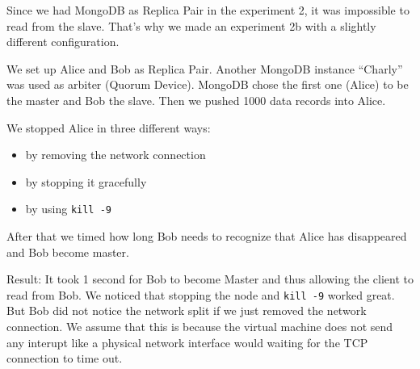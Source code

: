 Since we had MongoDB as Replica Pair in the experiment 2, it was
impossible to read from the slave. That's why we made an experiment
2b with a slightly different configuration.

We set up Alice and Bob as Replica Pair. Another MongoDB instance
``Charly'' was used as arbiter (Quorum Device). MongoDB chose the
first one (Alice) to be the master and Bob the slave. Then we
pushed 1000 data records into Alice.

We stopped Alice in three different ways:

\begin{itemize}
\item
  by removing the network connection
\item
  by stopping it gracefully
\item
  by using \texttt{kill -9}
\end{itemize}
After that we timed how long Bob needs to recognize that Alice has
disappeared and Bob become master.

Result: It took 1 second for Bob to become Master and thus allowing
the client to read from Bob. We noticed that stopping the node and \texttt{kill -9} worked great. But
Bob did not notice the network split if we just removed the network
connection. We assume that this is because the virtual machine does
not send any interupt like a physical network interface would
waiting for the TCP connection to time out.

%
